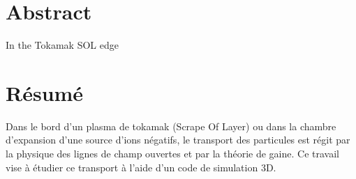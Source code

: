 \clearemptydoublepage
	
	\section*{Abstract}
		In the Tokamak SOL edge
	\section*{Résumé}
		Dans le bord d'un plasma de tokamak (Scrape Of Layer) 
		ou dans la chambre d'expansion d'une source d'ions négatifs,
		le transport des particules est régit par la physique des
		lignes de champ ouvertes et par la théorie de gaine.
		Ce travail vise à étudier ce transport à l'aide d'un code 
		de simulation 3D.